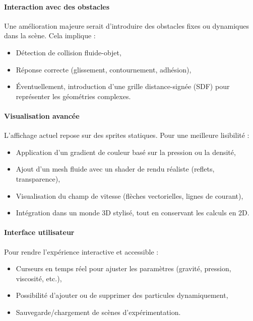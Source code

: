 \documentclass{article}
\begin{document}
\paragraph{Interaction avec des obstacles}

Une amélioration majeure serait d’introduire des obstacles fixes ou dynamiques dans la scène. Cela implique :

\begin{itemize}
\item Détection de collision fluide-objet,
\item Réponse correcte (glissement, contournement, adhésion),
\item Éventuellement, introduction d’une grille distance-signée (SDF) pour représenter les géométries complexes.
\end{itemize}

\paragraph{Visualisation avancée}

L’affichage actuel repose sur des sprites statiques. Pour une meilleure lisibilité :

\begin{itemize}
\item Application d’un gradient de couleur basé sur la pression ou la densité,
\item Ajout d’un mesh fluide avec un shader de rendu réaliste (reflets, transparence),
\item Visualisation du champ de vitesse (flèches vectorielles, lignes de courant),
\item Intégration dans un monde 3D stylisé, tout en conservant les calculs en 2D.
\end{itemize}

\paragraph{Interface utilisateur}

Pour rendre l’expérience interactive et accessible :

\begin{itemize}
\item Curseurs en temps réel pour ajuster les paramètres (gravité, pression, viscosité, etc.),
\item Possibilité d’ajouter ou de supprimer des particules dynamiquement,
\item Sauvegarde/chargement de scènes d’expérimentation.
\end{itemize}
\end{document}
